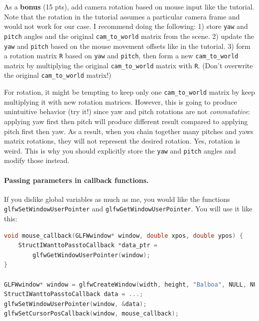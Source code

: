 As a \textbf{bonus} (15 pts), add camera rotation based on mouse input like the tutorial. Note that the rotation in the tutorial assumes a particular camera frame and would not work for our case. I recommend doing the following: 1) store \lstinline{yaw} and \lstinline{pitch} angles and the original \lstinline{cam_to_world} matrix from the scene. 2) update the \lstinline{yaw} and \lstinline{pitch} based on the mouse movement offsets like in the tutorial. 3) form a rotation matrix \lstinline{R} based on \lstinline{yaw} and \lstinline{pitch}, then form a new \lstinline{cam_to_world} matrix by multiplying the original \lstinline{cam_to_world} matrix with \lstinline{R}. (Don't overwrite the original \lstinline{cam_to_world} matrix!) 

For rotation, it might be tempting to keep only one \lstinline{cam_to_world} matrix by keep multiplying it with new rotation matrices. However, this is going to produce unintuitive behavior (try it!) since yaw and pitch rotations are not \emph{commutative}: applying yaw first then pitch will produce different result compared to applying pitch first then yaw. As a result, when you chain together many pitches and yaws matrix rotations, they will not represent the desired rotation. Yes, rotation is weird. This is why you should explicitly store the \lstinline{yaw} and \lstinline{pitch} angles and modify those instead.

\paragraph{Passing parameters in callback functions.} If you dislike global variables as much as me, you would like the functions \lstinline{glfwSetWindowUserPointer} and \lstinline{glfwGetWindowUserPointer}. You will use it like this:
\begin{lstlisting}[language=C++]
void mouse_callback(GLFWwindow* window, double xpos, double ypos) {
    StructIWanttoPasstoCallback *data_ptr =
        glfwGetWindowUserPointer(window);
}

GLFWwindow* window = glfwCreateWindow(width, height, "Balboa", NULL, NULL);
StructIWanttoPasstoCallback data = ...;
glfwSetWindowUserPointer(window, &data);
glfwSetCursorPosCallback(window, mouse_callback);
\end{lstlisting}

